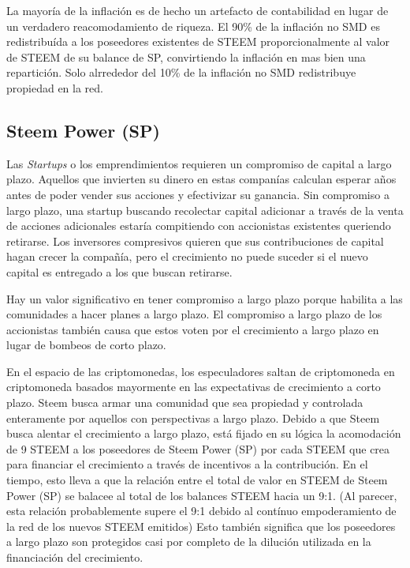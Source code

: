 \documentclass[a4paper,titlepage,final]{article}
\begin{document}
La mayoría de la inflación es de hecho un artefacto de contabilidad en lugar de un verdadero reacomodamiento de riqueza. El 90\% de la inflación no SMD es redistribuída a los poseedores existentes de STEEM proporcionalmente al valor de STEEM de su balance de SP, convirtiendo la inflación en mas bien una repartición. Solo alrrededor del 10\% de la inflación no SMD redistribuye propiedad en la red.

\subsection{Steem Power (SP)}

Las \textit{Startups} o los emprendimientos requieren un compromiso de capital a largo plazo. Aquellos que invierten su dinero en estas companías calculan esperar años antes de poder vender sus acciones y efectivizar su ganancia. Sin compromiso a largo plazo, una startup buscando recolectar capital adicionar a través de la venta de acciones adicionales estaría compitiendo con accionistas existentes queriendo retirarse. Los inversores compresivos quieren que sus contribuciones de capital hagan crecer la compañía, pero el crecimiento no puede suceder si el nuevo capital es entregado a los que buscan retirarse.

Hay un valor significativo en tener compromiso a largo plazo porque habilita a las comunidades a hacer planes a largo plazo. El compromiso a largo plazo de los accionistas también causa que estos voten por el crecimiento a largo plazo en lugar de bombeos de corto plazo.

En el espacio de las criptomonedas, los especuladores saltan de criptomoneda en criptomoneda basados mayormente en las expectativas de crecimiento a corto plazo. Steem busca armar una comunidad que sea propiedad y controlada enteramente por aquellos con perspectivas a largo plazo. Debido a que Steem busca alentar el crecimiento a largo plazo, está fijado en su lógica la acomodación de 9 STEEM a los poseedores de Steem Power (SP) por cada STEEM que crea para financiar el crecimiento a través de incentivos a la contribución. En el tiempo, esto lleva a que la relación entre el total de valor en STEEM de Steem Power (SP) se balacee al total de los balances STEEM hacia un 9:1. (Al parecer, esta relación probablemente supere el 9:1 debido al contínuo empoderamiento de la red de los nuevos STEEM emitidos) Esto también significa que los poseedores a largo plazo son protegidos casi por completo de la dilución utilizada en la financiación del crecimiento.
\end{document}

